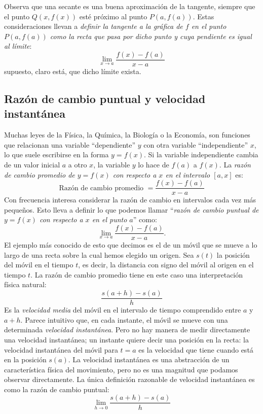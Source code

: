 

Observa que una secante es una buena aproximación de la tangente,
siempre que el punto $Q(x,f(x))$ esté próximo al punto $P(a,f(a))$.
Estas consideraciones llevan a \emph{definir la tangente a la gráfica
de $f$ en el punto $P(a,f(a))$ como la recta que pasa por dicho
punto y cuya pendiente es igual al límite}: 
\[
\lim_{x\to a}\frac{f(x)-f(a)}{x-a}
\]
supuesto, claro está, que dicho límite exista. 

\subsection{Razón de cambio puntual y velocidad instantánea}

Muchas leyes de la Física, la Química, la Biología o la Economía,
son funciones que relacionan una variable ``dependiente'' $y$ con
otra variable ``independiente'' $x$, lo que suele escribirse en
la forma $y=f(x)$. Si la variable independiente cambia de un valor
inicial $a$ a otro $x$, la variable $y$ lo hace de $f(a)$ a $f(x)$.
La \emph{razón de cambio promedio de $y=f(x)$ con respecto a $x$
en el intervalo $[a,x]$} es: 
\[
\textrm{Razón de cambio promedio\ }=\frac{f(x)-f(a)}{x-a}
\]
Con frecuencia interesa considerar la razón de cambio en intervalos
cada vez más pequeños. Esto lleva a definir lo que podemos llamar
``\emph{razón de cambio puntual de $y=f(x)$ con respecto a $x$
en el punto $a$}'' como: 
\[
\lim_{x\to a}\frac{f(x)-f(a)}{x-a}.
\]
El ejemplo más conocido de esto que decimos es el de un móvil que
se mueve a lo largo de una recta sobre la cual hemos elegido un origen.
Sea $s(t)$ la posición del móvil en el tiempo $t$, es decir, la
distancia con signo del móvil al origen en el tiempo $t$. La razón
de cambio promedio tiene en este caso una interpretación física natural:
\[
\frac{s(a+h)-s(a)}{h}
\]
Es la \emph{velocidad media} del móvil en el intervalo de tiempo comprendido
entre $a$ y $a+h$. Parece intuitivo que, en cada instante, el móvil
se mueve con una determinada \emph{velocidad instantánea}. Pero no
hay manera de medir directamente una velocidad instantánea; un instante
quiere decir una posición en la recta: la velocidad instantánea del
móvil para $t=a$ es la velocidad que tiene cuando está en la posición
$s(a)$. La velocidad instantánea es una abstracción de un característica
física del movimiento, pero no es una magnitud que podamos observar
directamente. La única definición razonable de velocidad instantánea
es como la razón de cambio puntual: 
\[
\lim_{h\to0}\frac{s(a+h)-s(a)}{h}
\]

